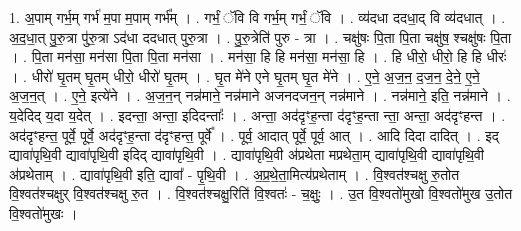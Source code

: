 \documentclass[17pt]{extarticle}
\begin{document}
1. अ॒पाम् गर्भ॒म् गर्भ॑ म॒पा म॒पाम् गर्भ᳚म् । . गर्भं॒ ॅवि वि गर्भ॒म् गर्भं॒ ॅवि । . व्य॑दधा ददधा॒द् वि व्य॑दधात् । . अ॒द॒धा॒त् पु॒रु॒त्रा पु॑रु॒त्रा ऽद॑धा ददधात् पुरु॒त्रा । . पु॒रु॒त्रेति॑ पुरु - त्रा । . चक्षु॑षः पि॒ता पि॒ता चक्षु॑ष॒ श्चक्षु॑षः पि॒ता । . पि॒ता मन॑सा॒ मन॑सा पि॒ता पि॒ता मन॑सा । . मन॑सा॒ हि हि मन॑सा॒ मन॑सा॒ हि । . हि धीरो॒ धीरो॒ हि हि धीरः॑ । . धीरो॑ घृ॒तम् घृ॒तम् धीरो॒ धीरो॑ घृ॒तम् । . घृ॒त मे॑ने एने घृ॒तम् घृ॒त मे॑ने । . ए॒ने॒ अ॒ज॒न॒ द॒ज॒न॒ दे॒ने॒ ए॒ने॒ अ॒ज॒न॒त् । . ए॒ने॒ इत्ये॑ने । . अ॒ज॒न॒न् नन्न॑माने॒ नन्न॑माने अजनदजन॒न् नन्न॑माने । . नन्न॑माने॒ इति॒ नन्न॑माने । . य॒देदिद् य॒दा य॒देत् । . इदन्ता॒ अन्ता॒ इदिदन्ताः᳚ । . अन्ता॒ अद॑दृꣳह॒न्ता द॑दृꣳह॒न्ता न्ता॒ अन्ता॒ अद॑दृꣳहन्त । . अद॑दृꣳहन्त॒ पूर्वे॒ पूर्वे॒ अद॑दृꣳह॒न्ता द॑दृꣳहन्त॒ पूर्वे᳚ । . पूर्व॒ आदात् पूर्वे॒ पूर्व॒ आत् । . आदि दिदा दादित् । . इद् द्यावा॑पृथि॒वी द्यावा॑पृथि॒वी इदिद् द्यावा॑पृथि॒वी । . द्यावा॑पृथि॒वी अ॑प्रथेता मप्रथेता॒म् द्यावा॑पृथि॒वी द्यावा॑पृथि॒वी अ॑प्रथेताम् । . द्यावा॑पृथि॒वी इति॒ द्यावा᳚ - पृ॒थि॒वी । . अ॒प्र॒थे॒ता॒मित्य॑प्रथेताम् । . वि॒श्वत॑श्चक्षु रु॒तोत वि॒श्वत॑श्चक्षुर् वि॒श्वत॑श्चक्षु रु॒त । . वि॒श्वत॑श्चक्षु॒रिति॑ वि॒श्वतः॑ - च॒क्षुः॒ । . उ॒त वि॒श्वतो॑मुखो वि॒श्वतो॑मुख उ॒तोत वि॒श्वतो॑मुखः । \newline
\end{document}
